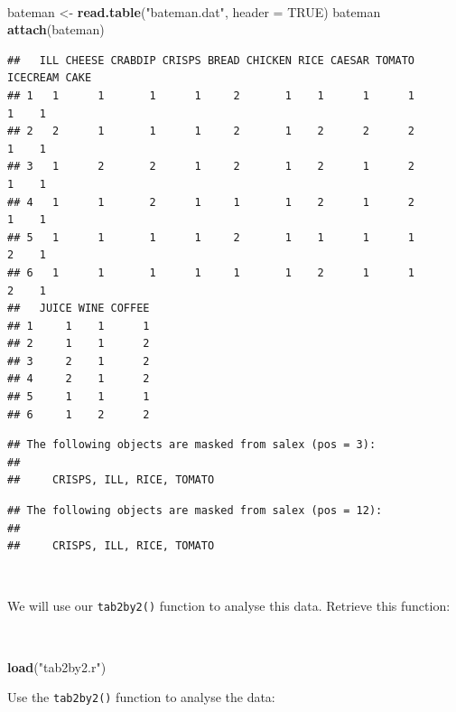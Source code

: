 \documentclass[12pt,a4paper]{book}
\newenvironment{Shaded}{\begin{snugshade}}{\end{snugshade}}
\newcommand{\KeywordTok}[1]{\textcolor[rgb]{0.13,0.29,0.53}{\textbf{#1}}}
\newcommand{\DataTypeTok}[1]{\textcolor[rgb]{0.13,0.29,0.53}{#1}}
\newcommand{\StringTok}[1]{\textcolor[rgb]{0.31,0.60,0.02}{#1}}
\newcommand{\OtherTok}[1]{\textcolor[rgb]{0.56,0.35,0.01}{#1}}
\newcommand{\NormalTok}[1]{#1}
\theoremstyle{definition}
\theoremstyle{definition}
\theoremstyle{definition}
\theoremstyle{remark}
\begin{document}
~

\begin{Shaded}
\begin{Highlighting}[]
\NormalTok{bateman <-}\StringTok{ }\KeywordTok{read.table}\NormalTok{(}\StringTok{"bateman.dat"}\NormalTok{, }\DataTypeTok{header =} \OtherTok{TRUE}\NormalTok{)}
\NormalTok{bateman}
\KeywordTok{attach}\NormalTok{(bateman)}
\end{Highlighting}
\end{Shaded}

\begin{verbatim}
##   ILL CHEESE CRABDIP CRISPS BREAD CHICKEN RICE CAESAR TOMATO ICECREAM CAKE
## 1   1      1       1      1     2       1    1      1      1        1    1
## 2   2      1       1      1     2       1    2      2      2        1    1
## 3   1      2       2      1     2       1    2      1      2        1    1
## 4   1      1       2      1     1       1    2      1      2        1    1
## 5   1      1       1      1     2       1    1      1      1        2    1
## 6   1      1       1      1     1       1    2      1      1        2    1
##   JUICE WINE COFFEE
## 1     1    1      1
## 2     1    1      2
## 3     2    1      2
## 4     2    1      2
## 5     1    1      1
## 6     1    2      2
\end{verbatim}

\begin{verbatim}
## The following objects are masked from salex (pos = 3):
## 
##     CRISPS, ILL, RICE, TOMATO
\end{verbatim}

\begin{verbatim}
## The following objects are masked from salex (pos = 12):
## 
##     CRISPS, ILL, RICE, TOMATO
\end{verbatim}

~

We will use our \texttt{tab2by2()} function to analyse this data.
Retrieve this function:

~

\begin{Shaded}
\begin{Highlighting}[]
\KeywordTok{load}\NormalTok{(}\StringTok{"tab2by2.r"}\NormalTok{)}
\end{Highlighting}
\end{Shaded}

\newpage

Use the \texttt{tab2by2()} function to analyse the data:

~
\end{document}
